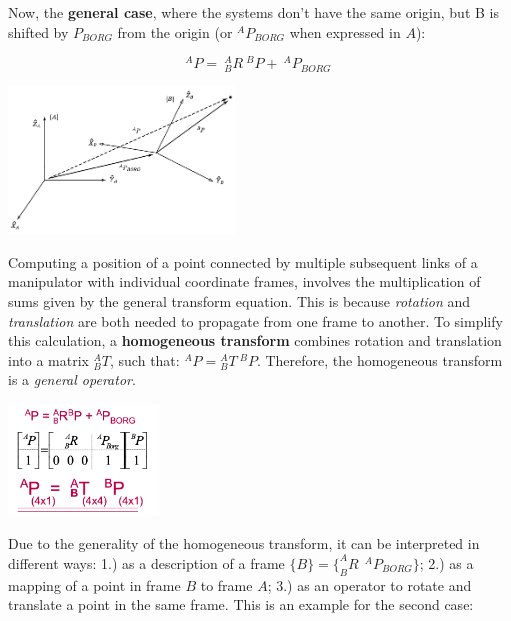 Now, the \textbf{general case}, where the systems don't have the same origin, but B is shifted by $P_{BORG}$ from the origin (or $^{A}P_{BORG}$ when expressed in $A$):

$$^{A}P =\ ^{A}_{B}R\ ^{B}P + \ ^{A}P_{BORG}\ $$ 

\begin{center}
	\includegraphics[width=6cm]{sections/imgs/6.png}
\end{center}

Computing a position of a point connected by multiple subsequent links of a manipulator with individual coordinate frames, involves the multiplication of sums given by the general transform equation. This is because \textit{rotation} and \textit{translation} are both needed to propagate from one frame to another. To simplify this calculation, a \textbf{homogeneous transform} combines rotation and translation into a matrix $_{B}^{A}T$, such that: ${}^{A}P={}_{B}^{A}T\ ^{B}P$. Therefore, the homogeneous transform is a \textit{general operator}.

\begin{center}
	\includegraphics[width=4cm]{sections/imgs/2_homogeneous_transform.png}
\end{center}

Due to the generality of the homogeneous transform, it can be interpreted in different ways: 1.) as a description of a frame $\{B\}=\{_{B}^{A}R \ \ ^{A}P_{BORG}\}$; 2.) as a mapping of a point in frame $B$ to frame $A$; 3.) as an operator to rotate and translate a point in the same frame. This is an example for the second case:

